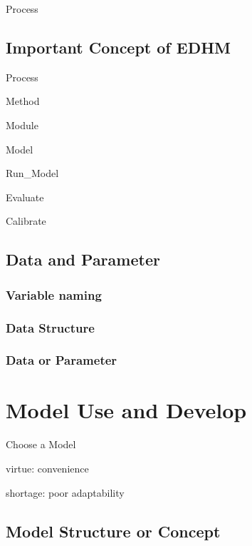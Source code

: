 \documentclass[
]{book}
\begin{document}
Process

\hypertarget{important-concept-of-edhm}{%
\section{Important Concept of EDHM}\label{important-concept-of-edhm}}

Process

Method

Module

Model

Run\_Model

Evaluate

Calibrate

\hypertarget{data-and-parameter}{%
\section{Data and Parameter}\label{data-and-parameter}}

\hypertarget{variable-naming}{%
\subsection{Variable naming}\label{variable-naming}}

\hypertarget{data-structure}{%
\subsection{Data Structure}\label{data-structure}}

\hypertarget{data-or-parameter}{%
\subsection{Data or Parameter}\label{data-or-parameter}}

\hypertarget{develop}{%
\chapter{Model Use and Develop}\label{develop}}

Choose a Model

virtue: convenience

shortage: poor adaptability

\hypertarget{model-structure-or-concept}{%
\section{Model Structure or Concept}\label{model-structure-or-concept}}
\end{document}
